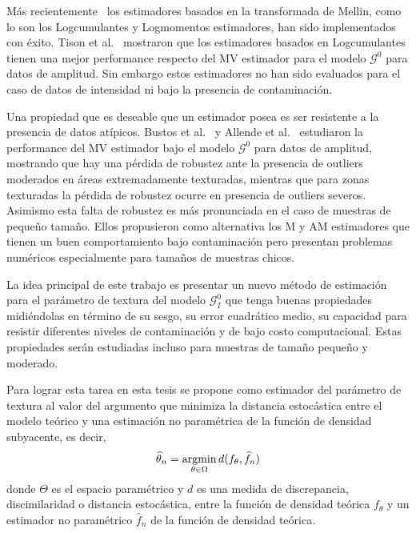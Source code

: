Más recientemente~\cite{MellinAnalysisPolSAR,BujorTrouveValetNicolas2004,khan2014} los estimadores basados en la transformada de Mellin, como lo son los  Logcumulantes y Logmomentos estimadores, han sido implementados con éxito. Tison et al.~\cite{Tison2004} mostraron que los estimadores basados en  Logcumulantes tienen una mejor performance respecto del MV estimador para el modelo $\mathcal G^0$ para datos de amplitud. Sin embargo estos estimadores no han sido evaluados para el caso de datos de intensidad ni bajo la presencia de contaminación.

Una propiedad que es deseable que un estimador posea es ser resistente a la presencia de datos atípicos. Bustos et al.~\cite{BustosFreryLucini:Mestimators:2001} y Allende et al.~\cite{AllendeFreryetal:JSCS:05} estudiaron la performance del MV estimador bajo el modelo $\mathcal{G}^{0}$ para datos de amplitud, mostrando que hay una pérdida de robustez ante la presencia de outliers moderados en áreas extremadamente texturadas, mientras que para zonas texturadas la pérdida de robustez ocurre en presencia de outliers severos. Asimismo esta falta de robustez es más pronunciada en el caso de muestras de pequeño tamaño. Ellos propusieron como alternativa los M y AM estimadores que tienen un buen comportamiento bajo contaminación pero presentan problemas numéricos especialmente para tamaños de muestras chicos.

La idea principal de este trabajo es presentar un nuevo método de estimación para el parámetro de textura del modelo $\mathcal{G}_I^0$ que tenga  buenas propiedades midiéndolas en término de su sesgo, su error cuadrático medio, su capacidad para resistir diferentes niveles de contaminación y de bajo costo computacional. Estas propiedades serán estudiadas incluso para muestras de tamaño pequeño y moderado. 

Para lograr esta tarea en esta tesis se propone como estimador del parámetro de textura al valor del argumento que minimiza la distancia estocástica entre el modelo teórico y una estimación no paramétrica de la función de densidad subyacente, es decir,
\begin{align}
\label{PropuestaMDE}
\widehat{\theta}_n=\mathop{\rm argmin} \limits_{\theta\in\Omega} d(f_{\theta}, \widehat{f}_n)
\end{align}
donde $\Theta$ es el espacio paramétrico y $d$ es una medida de discrepancia, discimilaridad o distancia estocástica, entre la función de densidad teórica $f_{\theta}$ y un estimador no paramétrico $\widehat{f}_n$ de la función de densidad teórica.


